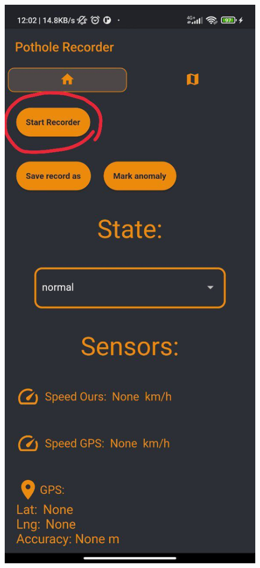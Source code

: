 	\begin{figure}[htb]
		\centering
		\includegraphics[scale = 0.2]{Graphics/apk_start_recording.jpg}

\end{figure}
